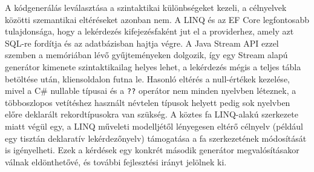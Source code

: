 A kódgenerálás leválasztása a szintaktikai különbségeket kezeli, a célnyelvek közötti szemantikai eltéréseket azonban nem. A LINQ és az EF Core legfontosabb tulajdonsága, hogy a lekérdezés kifejezésfaként jut el a providerhez, amely azt SQL-re fordítja és az adatbázisban hajtja végre. A Java Stream API ezzel szemben a memóriában lévő gyűjteményeken dolgozik, így egy Stream alapú generátor kimenete szintaktikailag helyes lehet, a lekérdezés mégis a teljes tábla betöltése után, kliensoldalon futna le. Hasonló eltérés a null-értékek kezelése, mivel a C\# nullable típusai és a \texttt{??} operátor nem minden nyelvben léteznek, a többoszlopos vetítéshez használt névtelen típusok helyett pedig sok nyelvben előre deklarált rekordtípusokra van szükség. A köztes fa LINQ-alakú szerkezete miatt végül egy, a LINQ műveleti modelljétől lényegesen eltérő célnyelv (például egy tisztán deklaratív lekérdezőnyelv) támogatása a fa szerkezetének módosítását is igényelheti. Ezek a kérdések egy konkrét második generátor megvalósításakor válnak eldönthetővé, és további fejlesztési irányt jelölnek ki.
